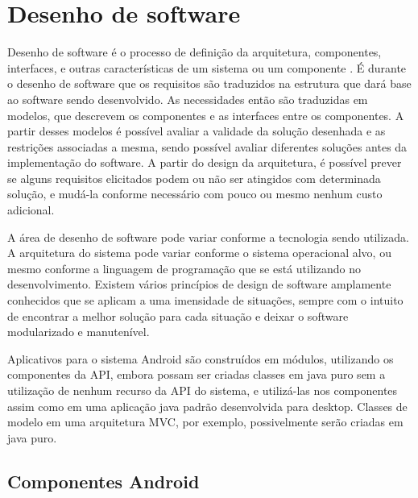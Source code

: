 

\section{Desenho de software}

Desenho de software é o processo de definição da arquitetura, componentes, interfaces, e outras características de um sistema ou um componente \cite{swebok}. É durante o desenho de software que os requisitos são traduzidos na estrutura que dará base ao software sendo desenvolvido. As necessidades então são traduzidas em modelos, que descrevem os componentes e as interfaces entre os componentes. A partir desses modelos é possível avaliar a validade da solução desenhada e as restrições associadas a mesma, sendo possível avaliar diferentes soluções antes da implementação do software. A partir do design da arquitetura, é possível prever se alguns requisitos elicitados podem ou não ser atingidos com determinada solução, e mudá-la conforme necessário com pouco ou mesmo nenhum custo adicional.

A área de desenho de software pode variar conforme a tecnologia sendo utilizada. A arquitetura do sistema pode variar conforme o sistema operacional alvo, ou mesmo conforme a linguagem de programação que se está utilizando no desenvolvimento. Existem vários princípios de design de software amplamente conhecidos que se aplicam a uma imensidade de situações, sempre com o intuito de encontrar a melhor solução para cada situação e deixar o software modularizado e manutenível.

Aplicativos para o sistema Android são construídos em módulos, utilizando os componentes da API, embora possam ser criadas classes em java puro sem a utilização de nenhum recurso da API do sistema, e utilizá-las nos componentes assim como em uma aplicação java padrão desenvolvida para desktop. Classes de modelo em uma arquitetura MVC, por exemplo, possivelmente serão criadas em java puro.


\subsection{Componentes Android}


